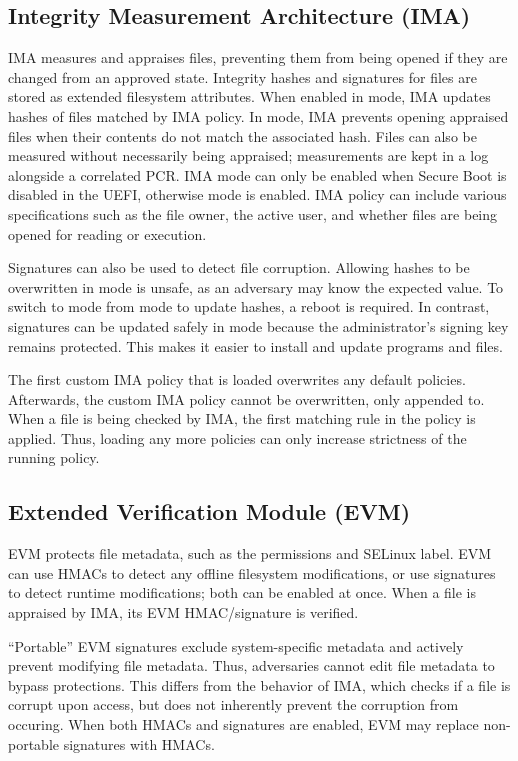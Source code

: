 \documentclass[12pt,letterpaper]{kuthesis}
\begin{document}
\subsection{Integrity Measurement Architecture (IMA)}
IMA \cite{Sailer:2004:Integrity-Measurement-Architecture,IBM:IMA-Documentation} measures and appraises files,
preventing them from being opened if they are changed from an approved state.
Integrity hashes and signatures for files are stored as extended filesystem attributes.
When enabled in \fix mode, IMA updates hashes of files matched by IMA policy.
In \appraise mode, IMA prevents opening appraised files when their contents do not match the associated hash.
Files can also be measured without necessarily being appraised; measurements are kept in a log alongside a correlated PCR.
IMA \fix mode can only be enabled when Secure Boot is disabled in the UEFI,
otherwise \appraise mode is enabled.
IMA policy can include various specifications such as the file owner, the active user, and whether files are being opened for reading or execution.

Signatures can also be used to detect file corruption.
Allowing hashes to be overwritten in \appraise mode is unsafe, as an adversary may know the expected value.
To switch to \fix mode from \appraise mode to update hashes, a reboot is required.
In contrast, signatures can be updated safely in \appraise mode because the administrator's signing key remains protected.
This makes it easier to install and update programs and files.

The first custom IMA policy that is loaded overwrites any default policies.
Afterwards, the custom IMA policy cannot be overwritten, only appended to.
When a file is being checked by IMA, the first matching rule in the policy is applied.
Thus, loading any more policies can only increase strictness of the running policy.

\subsection{Extended Verification Module (EVM)}
\label{sec:evm}
EVM \cite{Zohar:EVM:2010,IBM:IMA-Documentation} protects file meta\-data, such as the permissions and SELinux label.
EVM can use HMACs to detect any offline filesystem modifications, or use signatures to detect runtime modifications;
both can be enabled at once.
When a file is appraised by IMA, its EVM HMAC/signature is verified.

``Portable'' EVM signatures exclude system-specific metadata and actively prevent modifying file metadata.
Thus, adversaries cannot edit file metadata to bypass protections.
This differs from the behavior of IMA, which checks if a file is corrupt upon access,
but does not inherently prevent the corruption from occuring.
When both HMACs and signatures are enabled, EVM may replace non-portable signatures with HMACs.
\end{document}
